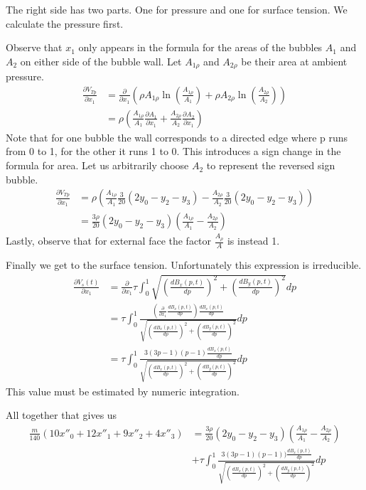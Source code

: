 \documentclass{article}
\begin{document}
The right side has two parts. One for pressure and one for surface tension. We
calculate the pressure first. 

Observe that $x_1$ only appears in the formula for the areas of the bubbles
$A_1$ and $A_2$ on either side of the bubble wall. Let $A_{1\rho}$ and
$A_{2\rho}$ be their area at ambient pressure. 
\begin{align*}
\frac{\partial V_{Tp}}{\partial x_1} &= \frac{\partial }{\partial x_1}
\left(
\rho A_{1\rho}
\ln\left(\frac{A_{1\rho}}{A_1}\right)
+\rho A_{2\rho}
\ln\left(\frac{A_{2\rho}}{A_2}\right)
\right)\\
&= 
\rho \left(
\frac{A_{1\rho}}{A_1} \frac{\partial A_1}{\partial x_1}
+\frac{A_{2\rho}}{A_2} \frac{\partial A_2}{\partial x_1}
\right)
\end{align*}
Note that for one bubble the wall corresponds to a directed edge where p runs
from 0 to 1, for the other it runs 1 to 0. This introduces a sign change in the
formula for area. Let us arbitrarily choose $A_2$ to represent the reversed sign
bubble.
\begin{align*}
\frac{\partial V_{Tp}}{\partial x_1} &= 
\rho \left(
\frac{A_{1\rho}}{A_1} \frac{3}{20}(2y_0-y_2-y_3)
-\frac{A_{2\rho}}{A_2} \frac{3}{20}(2y_0-y_2-y_3)
\right)\\
&= 
 \frac{3\rho}{20} (2y_0-y_2-y_3)
\left( \frac{A_{1\rho}}{A_1} -\frac{A_{2\rho}}{A_2}\right)
\end{align*}
Lastly, observe that for external face the factor $\frac{A_{\rho}}{A}$ is
instead 1.

Finally we get to the surface tension. Unfortunately this expression is
irreducible.
\begin{align*}
\frac{\partial V_s(t)}{\partial x_1}&=
\frac{\partial}{\partial x_1}
\tau \int_0^1 \sqrt{\left(\frac{d B_x(p,t)}{dp}\right)^2+\left(\frac{d
B_y(p,t)}{dp}\right)^2} dp\\
&=
\tau\int_0^1\frac{\left(\frac{\partial}{\partial x_1}\frac{d
B_x(p,t)}{dp}\right) \frac{d B_x(p,t)}{dp}}{
  \sqrt{\left(\frac{d B_x(p,t)}{dp}\right)^2+\left(\frac{d
B_y(p,t)}{dp}\right)^2}} dp\\
&=
\tau\int_0^1\frac{3(3p-1)(p-1)  \frac{d B_x(p,t)}{dp}}{
  \sqrt{\left(\frac{d B_x(p,t)}{dp}\right)^2+\left(\frac{d
B_y(p,t)}{dp}\right)^2}} dp
\end{align*}
This value must be estimated by numeric integration.

All together that gives us
\begin{align}
\frac{m}{140} \left(10x''_0+12x''_1+9x''_2+4x''_3 \right) &= 
 \frac{3\rho}{20} (2y_0-y_2-y_3)
\left( \frac{A_{1\rho}}{A_1} -\frac{A_{2\rho}}{A_2}\right)\\
&+\tau\int_0^1\frac{3(3p-1)(p-1))  \frac{d B_x(p,t)}{dp}}{
  \sqrt{\left(\frac{d B_x(p,t)}{dp}\right)^2+\left(\frac{d
B_y(p,t)}{dp}\right)^2}} dp \nonumber
\end{align}
\end{document}
